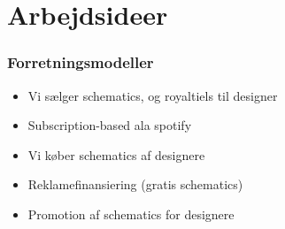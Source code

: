 \chapter{Arbejdsideer} %
\label{cha:arbejdsideer}

\subsection{Forretningsmodeller} %
\label{sub:forretningsmodeller}

\begin{itemize}
	\item Vi sælger schematics, og royaltiels til designer
	\item Subscription-based ala spotify
	\item Vi køber schematics af designere
	\item Reklamefinansiering (gratis schematics)
	\item Promotion af schematics for designere
\end{itemize}


